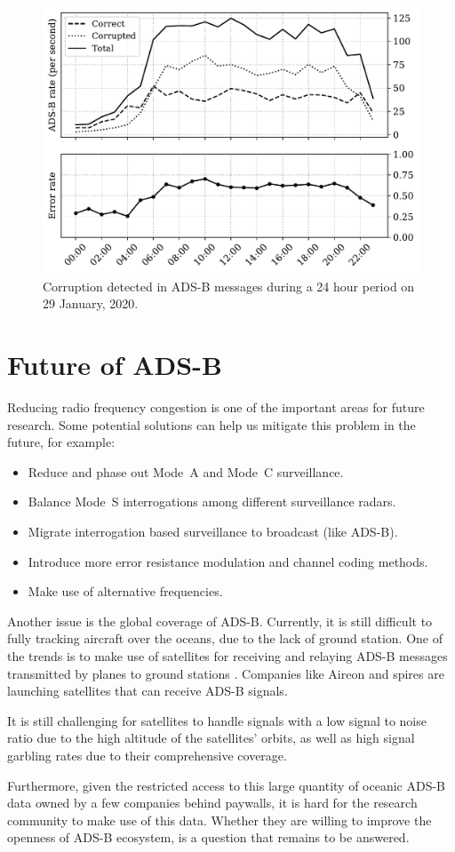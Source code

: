 \begin{figure}[ht]
    \centering
    \includegraphics[width=0.7\columnwidth]{figures/conclusion/adsb_corruption.pdf}
    \caption{Corruption detected in ADS-B messages during a 24 hour period on 29
    January, 2020.}
    \label{fig:adsb_corruption}
\end{figure}


\section{Future of ADS-B}
Reducing radio frequency congestion is one of the important areas for future research. Some potential solutions can help us mitigate this problem in the future, for example:

\begin{itemize}
    \item Reduce and phase out Mode~A and Mode~C surveillance.
    \item Balance Mode~S interrogations among different surveillance radars.
    \item Migrate interrogation based surveillance to broadcast (like ADS-B).
    \item Introduce more error resistance modulation and channel coding methods.
    \item Make use of alternative frequencies.
\end{itemize}

Another issue is the global coverage of ADS-B. Currently, it is still difficult to fully tracking aircraft over the oceans, due to the lack of ground station. One of the trends is to make use of satellites for receiving and relaying ADS-B messages transmitted by planes to ground stations \cite{noschese2011}. Companies like Aireon and spires are launching satellites that can receive ADS-B signals. 

It is still challenging for satellites to handle signals with a low signal to noise ratio due to the high altitude of the satellites' orbits, as well as high signal garbling rates due to their comprehensive coverage. 

Furthermore, given the restricted access to this large quantity of oceanic ADS-B data owned by a few companies behind paywalls,  it is hard for the research community to make use of this data. Whether they are willing to improve the openness of ADS-B ecosystem, is a question that remains to be answered.